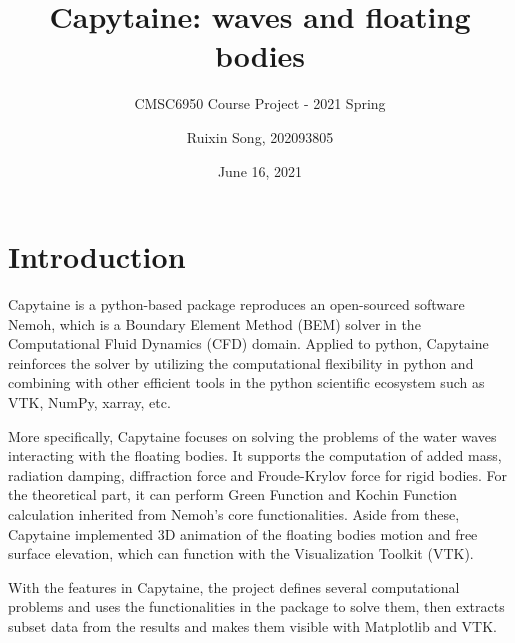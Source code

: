 \documentclass{article}
\title{Capytaine: waves and floating bodies}
\subtitle{CMSC6950 Course Project - 2021 Spring}
\author{Ruixin Song, 202093805}
\date{June 16, 2021}
\begin{document}
\maketitle

\section{Introduction}
Capytaine\cite{Ancellin2019} is a python-based package reproduces an open-sourced software Nemoh, which is a Boundary Element Method (BEM) solver in the Computational Fluid Dynamics (CFD) domain. Applied to python, Capytaine reinforces the solver by utilizing the computational flexibility in python and combining with other efficient tools in the python scientific ecosystem such as VTK, NumPy, xarray, etc. 

More specifically, Capytaine focuses on solving the problems of the water waves interacting with the floating bodies. It supports the computation of added mass, radiation damping, diffraction force and Froude-Krylov force for rigid bodies. For the theoretical part, it can perform Green Function and Kochin Function calculation inherited from Nemoh's core functionalities. Aside from these, Capytaine implemented 3D animation of the floating bodies motion and free surface elevation, which can function with the Visualization Toolkit (VTK).

With the features in Capytaine, the project defines several computational problems and uses the functionalities in the package to solve them, then extracts subset data from the results and makes them visible with Matplotlib and VTK.
\end{document}
